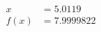 \documentclass[preview]{standalone}
\begin{document}
\begin{align*}
x &= 5.0119\\f(x) &= 7.9999822
\end{align*}
\end{document}
